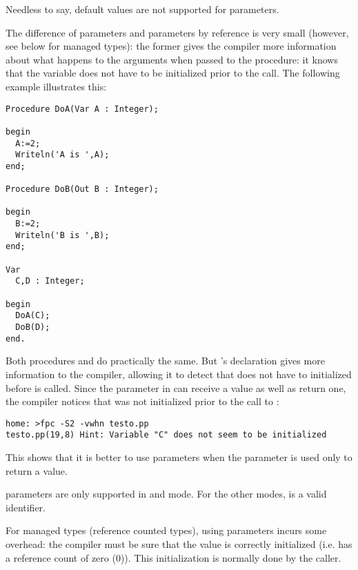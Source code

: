 Needless to say, default values are not supported for  parameters.

The difference of  parameters and parameters by reference is very small 
(however, see below for managed types):
the former gives the compiler more information about what happens to the
arguments when passed to the procedure: it knows that the variable does not
have to be initialized prior to the call. The following example illustrates
this:
\begin{verbatim}
Procedure DoA(Var A : Integer);

begin
  A:=2;
  Writeln('A is ',A);
end;

Procedure DoB(Out B : Integer);

begin
  B:=2;
  Writeln('B is ',B);
end;

Var
  C,D : Integer;

begin
  DoA(C);
  DoB(D);
end.
\end{verbatim}
Both procedures  and  do practically the same. But
's declaration gives more information to the compiler, allowing
it to detect that  does not have to initialized before 
is called. Since the parameter  in  can receive a value as
well as return one, the compiler notices that  was not initialized
prior to the call to :
\begin{verbatim}
home: >fpc -S2 -vwhn testo.pp
testo.pp(19,8) Hint: Variable "C" does not seem to be initialized
\end{verbatim}
This shows that it is better to use  parameters when the parameter
is used only to return a value.

\begin{remark}
 parameters are only supported in  and  mode. For the other 
modes,  is a valid identifier.
\end{remark}

\begin{remark}
For managed types (reference counted types), using  parameters incurs some overhead: 
the compiler must be sure that the value is correctly initialized (i.e. has a reference count 
of zero (0)). This initialization is normally done by the caller.
\end{remark}



%
